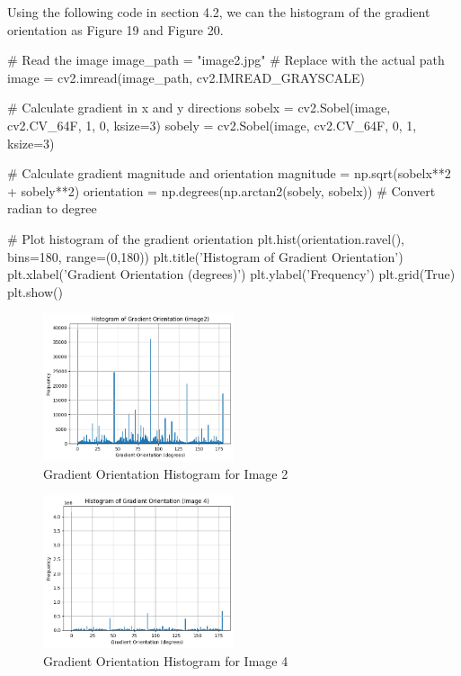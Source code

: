 \documentclass[12pt]{article}
\begin{document}
\quad Using the following code in section 4.2, we can the histogram of the gradient orientation as Figure 19 and Figure 20.
\begin{python}
# Read the image
image_path = "image2.jpg"  # Replace with the actual path
image = cv2.imread(image_path, cv2.IMREAD_GRAYSCALE)

# Calculate gradient in x and y directions
sobelx = cv2.Sobel(image, cv2.CV_64F, 1, 0, ksize=3)
sobely = cv2.Sobel(image, cv2.CV_64F, 0, 1, ksize=3)

# Calculate gradient magnitude and orientation
magnitude = np.sqrt(sobelx**2 + sobely**2)
orientation = np.degrees(np.arctan2(sobely, sobelx)) # Convert radian to degree

# Plot histogram of the gradient orientation
plt.hist(orientation.ravel(), bins=180, range=(0,180))
plt.title('Histogram of Gradient Orientation')
plt.xlabel('Gradient Orientation (degrees)')
plt.ylabel('Frequency')
plt.grid(True)
plt.show()
\end{python}

\begin{figure}
  \centering
  \includegraphics[width=0.5\textwidth]{gradient_orientation_histogram_image2.png}
  \caption{Gradient Orientation Histogram for Image 2}
  \label{fig:example}
\end{figure}

\begin{figure}
  \centering
  \includegraphics[width=0.5\textwidth]{gradient_orientation_histogram_image4.png}
  \caption{Gradient Orientation Histogram for Image 4}
  \label{fig:example}
\end{figure}
\end{document}

